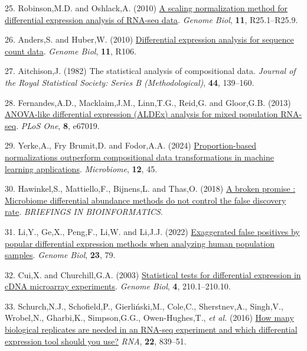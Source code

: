 \documentclass[
]{article}
\newlength{\cslhangindent}
\newenvironment{CSLReferences}[2] %
 {\begin{list}{}{%
  \setlength{\itemindent}{0pt}
  \setlength{\leftmargin}{0pt}
  \setlength{\parsep}{0pt}
  \ifodd #1
   \setlength{\leftmargin}{\cslhangindent}
   \setlength{\itemindent}{-1\cslhangindent}
  \fi
  \setlength{\itemsep}{#2\baselineskip}}}
 {\end{list}}
\begin{document}
\begin{CSLReferences}{1}{1}
25. Robinson,M.D. and Oshlack,A. (2010)
\href{https://doi.org/10.1186/gb-2010-11-3-r25}{A scaling normalization
method for differential expression analysis of {RNA-seq} data}.
\emph{Genome Biol}, \textbf{11}, R25.1--R25.9.

26. Anders,S. and Huber,W. (2010)
\href{https://doi.org/10.1186/gb-2010-11-10-r106}{Differential
expression analysis for sequence count data}. \emph{Genome Biol},
\textbf{11}, R106.

27. Aitchison,J. (1982) The statistical analysis of compositional data.
\emph{Journal of the Royal Statistical Society: Series B
(Methodological)}, \textbf{44}, 139--160.

28. Fernandes,A.D., Macklaim,J.M., Linn,T.G., Reid,G. and Gloor,G.B.
(2013) \href{https://doi.org/10.1371/journal.pone.0067019}{ANOVA-like
differential expression (ALDEx) analysis for mixed population RNA-seq}.
\emph{PLoS One}, \textbf{8}, e67019.

29. Yerke,A., Fry Brumit,D. and Fodor,A.A. (2024)
\href{https://doi.org/10.1186/s40168-023-01747-z}{Proportion-based
normalizations outperform compositional data transformations in machine
learning applications}. \emph{Microbiome}, \textbf{12}, 45.

30. Hawinkel,S., Mattiello,F., Bijnens,L. and Thas,O. (2018)
\href{http://dx.doi.org/10.1093/bib/bbx104}{A broken promise :
Microbiome differential abundance methods do not control the false
discovery rate}. \emph{BRIEFINGS IN BIOINFORMATICS}.

31. Li,Y., Ge,X., Peng,F., Li,W. and Li,J.J. (2022)
\href{https://doi.org/10.1186/s13059-022-02648-4}{Exaggerated false
positives by popular differential expression methods when analyzing
human population samples}. \emph{Genome Biol}, \textbf{23}, 79.

32. Cui,X. and Churchill,G.A. (2003)
\href{https://www.ncbi.nlm.nih.gov/pubmed/12702200}{Statistical tests
for differential expression in cDNA microarray experiments}.
\emph{Genome Biol}, \textbf{4}, 210.1--210.10.

33. Schurch,N.J., Schofield,P., Gierliński,M., Cole,C., Sherstnev,A.,
Singh,V., Wrobel,N., Gharbi,K., Simpson,G.G., Owen-Hughes,T., \emph{et
al.} (2016) \href{https://doi.org/10.1261/rna.053959.115}{How many
biological replicates are needed in an RNA-seq experiment and which
differential expression tool should you use?} \emph{RNA}, \textbf{22},
839--51.


\end{CSLReferences}
\end{document}
